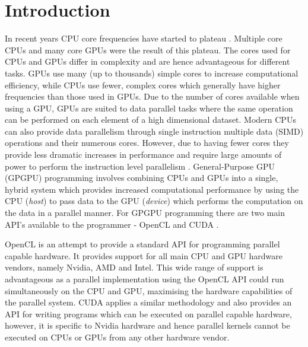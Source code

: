 \documentclass{sig-alternate-05-2015}
\begin{document}
%
%

%
%
\printccsdesc



\section{Introduction}\label{sec:intro}

In recent years CPU core frequencies have started to plateau 
\cite{standb}. Multiple core CPUs and many core GPUs were the result of this
plateau. The cores used for CPUs and GPUs differ 
in complexity and are hence advantageous for different tasks. GPUs use many 
(up to thousands) simple cores to increase computational efficiency, while CPUs 
use fewer, complex cores which generally have higher frequencies than those used
in GPUs. Due to the number of cores available when using a GPU, GPUs are suited 
to data parallel tasks where the same operation can be performed on each element 
of a high dimensional dataset. Modern CPUs can also provide data parallelism through
single instruction multiple data (SIMD) operations and their numerous cores. However, 
due to having fewer cores they provide less dramatic increases in performance and require 
large amounts of power to perform the instruction level parallelism \cite{kumar:power}.
General-Purpose GPU (GPGPU) programming involves combining CPUs and GPUs 
into a single, hybrid system which provides increased computational performance 
by using the CPU (\textit{host}) to pass data to the GPU (\textit{device}) which 
performs the computation on the data in a parallel manner.
For GPGPU programming there are two main API's available to the programmer - 
OpenCL \cite{opencl} and CUDA \cite{cuda}. 

OpenCL is an attempt to provide a standard API for programming parallel capable
hardware. It provides support for all main CPU and GPU hardware vendors, namely
Nvidia, AMD and Intel. This wide range of support is advantageous as a 
parallel implementation using the OpenCL API could run simultaneously on the CPU
and GPU, maximising the hardware capabilities of the parallel system. CUDA applies 
a similar methodology and also provides an API for writing programs which can be 
executed on parallel capable hardware, however, it is specific to Nvidia hardware 
and hence parallel kernels cannot be executed on CPUs or GPUs from any other 
hardware vendor.
\end{document}
